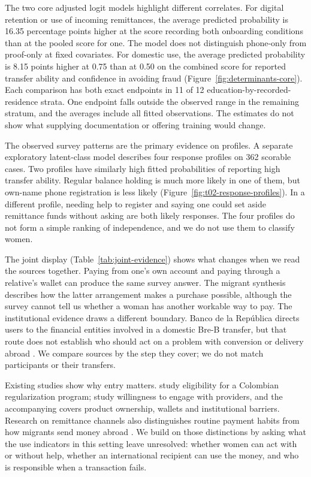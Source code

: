 The two core adjusted logit models highlight different correlates. For digital retention or use of incoming remittances, the average predicted probability is 16.35 percentage points higher at the score recording both onboarding conditions than at the pooled score for one. The model does not distinguish phone-only from proof-only at fixed covariates. For domestic use, the average predicted probability is 8.15 points higher at 0.75 than at 0.50 on the combined score for reported transfer ability and confidence in avoiding fraud (Figure~\ref{fig:determinants-core}). Each comparison has both exact endpoints in 11 of 12 education-by-recorded-residence strata. One endpoint falls outside the observed range in the remaining stratum, and the averages include all fitted observations. The estimates do not show what supplying documentation or offering training would change.

The observed survey patterns are the primary evidence on profiles. A separate exploratory latent-class model describes four response profiles on 362 scorable cases. Two profiles have similarly high fitted probabilities of reporting high transfer ability. Regular balance holding is much more likely in one of them, but own-name phone registration is less likely (Figure~\ref{fig:t02-response-profiles}). In a different profile, needing help to register and saying one could set aside remittance funds without asking are both likely responses. The four profiles do not form a simple ranking of independence, and we do not use them to classify women.

The joint display (Table~\ref{tab:joint-evidence}) shows what changes when we read the sources together. Paying from one's own account and paying through a relative's wallet can produce the same survey answer. The migrant synthesis describes how the latter arrangement makes a purchase possible, although the survey cannot tell us whether a woman has another workable way to pay. The institutional evidence draws a different boundary. Banco de la Rep\'ublica directs users to the financial entities involved in a domestic Bre-B transfer, but that route does not establish who should act on a problem with conversion or delivery abroad \citep{banrepfaq}. We compare sources by the step they cover; we do not match participants or their transfers.

Existing studies show why entry matters. \citet{ibanez2025} study eligibility for a Colombian regularization program; \citet{barboni2025} study willingness to engage with providers, and the accompanying \citet{ipaMigrantsDiagnostic} covers product ownership, wallets and institutional barriers. Research on remittance channels also distinguishes routine payment habits from how migrants send money abroad \citep{kosseVermeulen2014,martinRemittanceJourney2019}. We build on those distinctions by asking what the use indicators in this setting leave unresolved: whether women can act with or without help, whether an international recipient can use the money, and who is responsible when a transaction fails.

